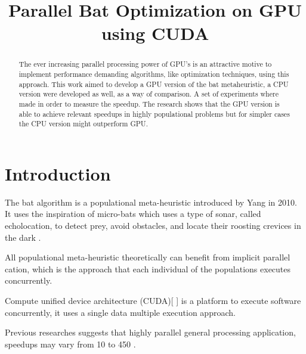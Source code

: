 \documentclass[conference]{IEEEtran}
\begin{document}
\title{Parallel Bat Optimization on GPU using CUDA}

\author{
\and
{}
}

\maketitle
\begin{abstract}
The ever increasing parallel processing power of GPU's is an attractive
motive to implement performance demanding algorithms, like optimization
techniques, using this approach. This work aimed to develop a GPU
version of the bat metaheuristic, a CPU version were developed as well,
as a way of comparison. A set of experiments where made in order to
measure the speedup. The research shows that the GPU version is able
to achieve relevant speedups in highly populational problems but for
simpler cases the CPU version might outperform GPU.
\end{abstract}
\IEEEpeerreviewmaketitle

\section{Introduction}

The bat algorithm is a populational meta-heuristic introduced by Yang in
2010. It uses the inspiration of micro-bats which uses a type of sonar,
called echolocation, to detect prey, avoid obstacles, and locate their
roosting crevices in the dark \cite{original}.

All populational meta-heuristic theoretically can benefit from implicit
parallel cation, which is the approach that each individual of the
populations executes concurrently.

Compute unified device architecture (CUDA)[ ] is a platform to execute software concurrently, it uses a single data
multiple execution approach.

Previous researches suggests that highly parallel general processing application, speedups may vary from 10 to 450 \cite{cuda_optimizations}.
\end{document}
